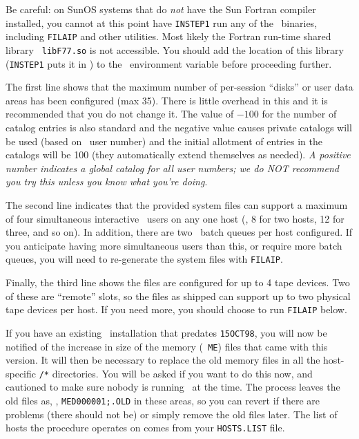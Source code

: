 \noindent Be careful: on SunOS systems that do {\it not\/} have the Sun
Fortran compiler installed, you cannot at this point have {\tt INSTEP1}
run any of the \AIPS\ binaries, including {\tt FILAIP} and other
utilities.  Most likely the Fortran run-time shared library {\tt
libF77.so} is not accessible.  You should add the location of this
library ({\tt INSTEP1} puts it in \AROOT) to the \LDLIB\ environment
variable before proceeding further.

The first line shows that the maximum number of per-session ``disks'' or
user data areas has been configured (max 35).  There is little overhead
in this and it is recommended that you do not change it.  The value of
$-100$ for the number of catalog entries is also standard and the
negative value causes private catalogs will be used (based on \AIPS\
user number) and the initial allotment of entries in the catalogs will
be 100 (they automatically extend themselves as needed).  {\it A
positive number indicates a global catalog for all user numbers; we do
NOT recommend you try this unless you know what you're doing\/}.

The second line indicates that the provided system files can support a
maximum of four simultaneous interactive \AIPS\ users on any one host
(\ie, 8 for two hosts, 12 for three, and so on).  In addition, there are
two \AIPS\ batch queues per host configured.  If you anticipate having
more simultaneous users than this, or require more batch queues, you
will need to re-generate the system files with {\tt FILAIP}.

Finally, the third line shows the files are configured for up to 4 tape
devices.  Two of these are ``remote'' slots, so the files as shipped can
support up to two physical tape devices per host.  If you need more, you
should choose to run {\tt FILAIP} below.

If you have an existing \AIPS\ installation that predates {\tt 15OCT98},
you will now be notified of the increase in size of the memory ({\tt
ME}) files that came with this version.  It will then be necessary to
replace the old memory files in all the host-specific {\tt\NET0/*}
directories.  You will be asked if you want to do this now, and
cautioned to make sure nobody is running \ttaips\ at the time.  The
process leaves the old files as, \eg, {\tt MED000001;.OLD} in these
areas, so you can revert if there are problems (there should not be) or
simply remove the old files later.  The list of hosts the procedure
operates on comes from your {\tt HOSTS.LIST} file.

